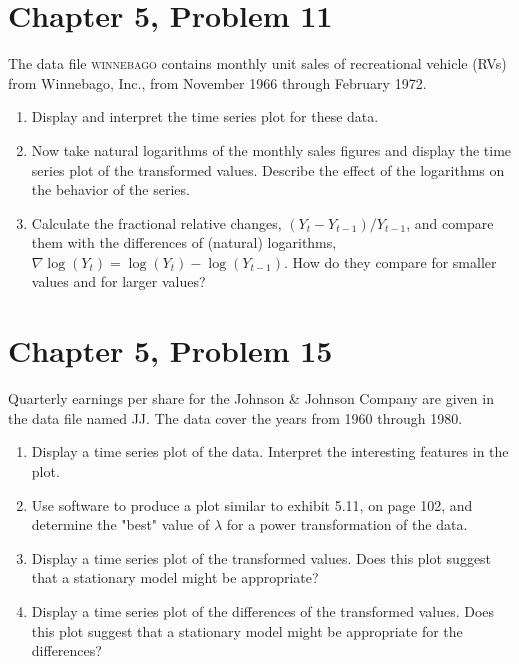 \documentclass[11pt]{article}
\newif\ifclearpage
\newcommand{\problem}[1]{\section*{#1}}
\newcommand{\solution}{\hrulefill}
\newcommand{\maybeclearpage}{\ifclearpage\clearpage\fi}
\begin{document}
\solution

\maybeclearpage
\problem{Chapter 5, Problem 11}
The data file \textsc{winnebago} contains monthly unit sales of recreational vehicle (RVs) from Winnebago, Inc., from November 1966 through February 1972. 
\begin{enumerate}
\item Display and interpret the time series plot for these data.
\item Now take natural logarithms of the monthly sales figures and display the time series plot of the transformed values. Describe the effect of the logarithms on the behavior of the series.
\item Calculate the fractional relative changes, $(Y_t - Y_{t-1})/Y_{t-1}$, and compare them with the differences of (natural) logarithms, $\nabla \log(Y_t) = \log(Y_t) - \log(Y_{t-1})$. How do they compare for smaller values and for larger values?
\end{enumerate}

\solution

\maybeclearpage
\problem{Chapter 5, Problem 15}
Quarterly earnings per share for the Johnson \& Johnson Company are given in the data file named \textsc{JJ}. The data cover the years from 1960 through 1980.
\begin{enumerate}
\item Display a time series plot of the data. Interpret the interesting features in the plot.
\item Use software to produce a plot similar to exhibit 5.11, on page 102, and determine the "best" value of $\lambda$ for a power transformation of the data.
\item Display a time series plot of the transformed values. Does this plot suggest that a stationary model might be appropriate?
\item Display a time series plot of the differences of the transformed values. Does this plot suggest that a stationary model might be appropriate for the differences?
\end{enumerate}

\solution

\maybeclearpage
\end{document}
